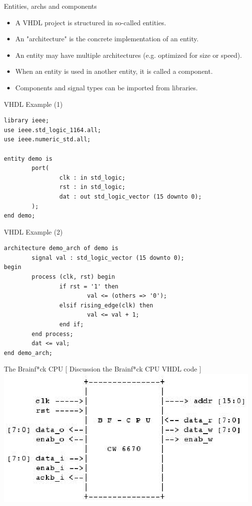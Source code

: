 \documentclass[pdf]{prosper}
\begin{document}
\begin{slide}{Entities, archs and components}
\begin{itemize}
\item A VHDL project is structured in so-called entities.
\vspace*{.3cm}
\item An "architecture" is the concrete implementation of an entity.
\vspace*{.3cm}
\item An entity may have multiple architectures (e.g. optimized for size or speed).
\vspace*{.3cm}
\item When an entity is used in another entity, it is called a component.
\vspace*{.3cm}
\item Components and signal types can be imported from libraries.
\end{itemize}
\end{slide}

\begin{slide}{VHDL Example (1)}
\begin{verbatim}
library ieee;
use ieee.std_logic_1164.all;
use ieee.numeric_std.all;

entity demo is
        port(
                clk : in std_logic;
                rst : in std_logic;
                dat : out std_logic_vector (15 downto 0);
        );
end demo;
\end{verbatim}
\end{slide}

\begin{slide}{VHDL Example (2)}
\begin{verbatim}
architecture demo_arch of demo is
        signal val : std_logic_vector (15 downto 0);
begin
        process (clk, rst) begin
                if rst = '1' then
                        val <= (others => '0');
                elsif rising_edge(clk) then
                        val <= val + 1;
                end if;
        end process;
        dat <= val;
end demo_arch;
\end{verbatim}
\end{slide}

\begin{slide}{The Brainf*ck CPU}
[ Discussion the Brainf*ck CPU VHDL code ]
\includegraphics[scale=.80]{schem.eps}
\end{slide}
\end{document}
